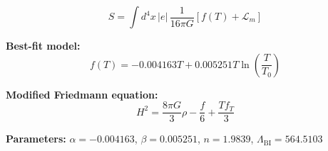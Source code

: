
\begin{equation}
  S = \int d^4x \, |e| \, \frac{1}{16\pi G} \left[ f(T) + \mathcal{L}_m \right]
\end{equation}

\textbf{Best-fit model:}
\begin{equation}
  f(T) = -0.004163 T + 0.005251 T \ln\!\left(\frac{T}{T_0}\right)
\end{equation}

\textbf{Modified Friedmann equation:}
\begin{equation}
  H^2 = \frac{8\pi G}{3} \rho - \frac{f}{6} + \frac{T f_T}{3}
\end{equation}

\textbf{Parameters:}
$\alpha = -0.004163$, \quad
$\beta = 0.005251$, \quad
$n = 1.9839$, \quad
$\Lambda_{\text{BI}} = 564.5103$